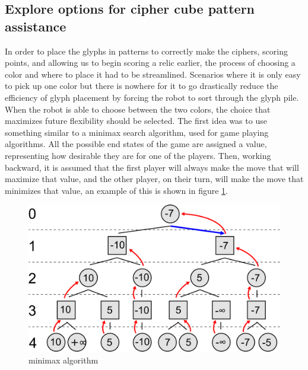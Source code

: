 \documentclass{article}
\begin{document}
\subsection{Explore options for cipher cube pattern assistance}
In order to place the glyphs in patterns to correctly make the ciphers, scoring points, and allowing us to begin scoring a relic earlier, the process of choosing a color and where to place it had to be streamlined. Scenarios where it is only easy to pick up one color but there is nowhere for it to go drastically reduce the efficiency of glyph placement by forcing the robot to sort through the glyph pile. When the robot is able to choose between the two colors, the choice that maximizes future flexibility should be selected. The first idea was to use something similar to a minimax search algorithm, used for game playing algorithms. All the possible end states of the game are assigned a value, representing how desirable they are for one of the players. Then, working backward, it is assumed that the first player will always make the move that will maximize that value, and the other player, on their turn, will make the move that minimizes that value, an example of this is shown in figure \ref{fig:minimax}.
\begin{figure}[h]
    \centering
    \includegraphics[width=.6\textwidth]{01/images/minimax.png}
    \caption{minimax algorithm}
    \label{fig:minimax}
\end{figure}
\end{document}
